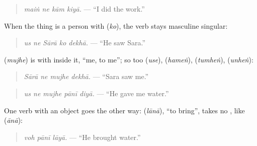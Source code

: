 \begin{quote}
\textbf{   }
\end{quote}

\begin{quote}
\emph{maiṅ ne kām kiyā.} — \textquotedblleft{}I did the work.\textquotedblright{}
\end{quote}

When the thing is a person with \textbf{} (\emph{ko}), the verb stays masculine singular:

\begin{quote}
\textbf{    }
\end{quote}

\begin{quote}
\emph{us ne Sārā ko dekhā.} — \textquotedblleft{}He saw Sara.\textquotedblright{}
\end{quote}

\textbf{} (\emph{mujhe}) is \textbf{} with \textbf{} inside it, \textquotedblleft{}me, to me\textquotedblright{}; so too \textbf{} (\emph{use}), \textbf{} (\emph{hameṅ}), \textbf{} (\emph{tumheṅ}), \textbf{} (\emph{unheṅ}):

\begin{quote}
\textbf{   }
\end{quote}

\begin{quote}
\emph{Sārā ne mujhe dekhā.} — \textquotedblleft{}Sara saw me.\textquotedblright{}
\end{quote}

\begin{quote}
\textbf{    }
\end{quote}

\begin{quote}
\emph{us ne mujhe pānī diyā.} — \textquotedblleft{}He gave me water.\textquotedblright{}
\end{quote}

One verb with an object goes the other way: \textbf{} (\emph{lānā}), \textquotedblleft{}to bring\textquotedblright{}, takes no \textbf{}, like \textbf{} (\emph{ānā}):

\begin{quote}
\textbf{  }
\end{quote}

\begin{quote}
\emph{voh pānī lāyā.} — \textquotedblleft{}He brought water.\textquotedblright{}
\end{quote}

